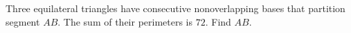 Three equilateral triangles have consecutive nonoverlapping bases that partition segment $AB$. The sum of their perimeters is $72$. Find $AB$.

